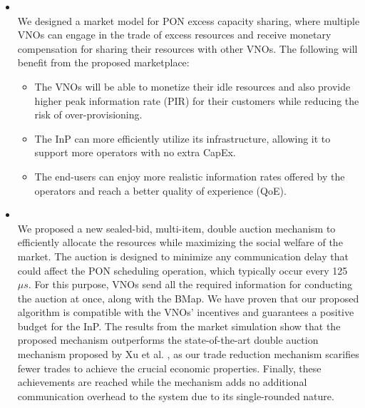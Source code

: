 \begin{itemize}
    \item \textit{\RQc}\\We designed a market model for \ac{PON} excess capacity sharing, where multiple \acp{VNO} can engage in the trade of excess resources and receive monetary compensation for sharing their resources with other \acp{VNO}. The following will benefit from the proposed marketplace:
    \begin{itemize}
    \item The \acp{VNO} will be able to monetize their idle resources and also provide higher peak information rate (PIR) for their customers while reducing the risk of over-provisioning. %
    \item The \ac{InP} can more efficiently utilize its infrastructure, allowing it to support more operators with no extra \ac{CapEx}.
    \item The end-users can enjoy more realistic information rates offered by the operators and reach a better quality of experience (QoE).
    \end{itemize} 
    
     \item \textit{\RQd}\\We proposed a new sealed-bid, multi-item, double auction mechanism to efficiently allocate the resources while maximizing the social welfare of the market. The auction is designed to minimize any communication delay that could affect the \ac{PON} scheduling operation, which typically occur every 125 $\mu s$. For this purpose, \acp{VNO} send all the required information for conducting the auction at once, along with the \ac{BMap}. We have proven that our proposed algorithm is compatible with the \acp{VNO}' incentives and guarantees a positive budget for the \ac{InP}. The results from the market simulation show that the proposed mechanism outperforms the state-of-the-art double auction mechanism proposed by Xu et al. \cite{5462277}, as our trade reduction mechanism scarifies fewer trades to achieve the crucial economic properties. Finally, these achievements are reached while the mechanism adds no additional communication overhead to the system due to its single-rounded nature.
\end{itemize}






